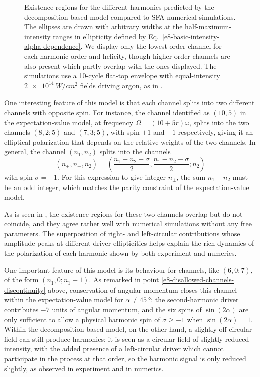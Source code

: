 \begin{figure}[h]
  \captionsetup{width=\textwidth}
  \caption[
  Existence regions for bicircular harmonics using the decomposition-based model, compared to SFA simulations
  ]{
  Existence regions for the different harmonics predicted by the decomposition-based model compared to SFA numerical simulations. The ellipses are drawn with arbitrary widths at the half-maximum-intensity ranges in ellipticity defined by Eq.~\eqref{e8-basic-intensity-alpha-dependence}. We display only the lowest-order channel for each harmonic order and helicity, though higher-order channels are also present which partly overlap with the ones displayed. 
  The simulations use a 10-cycle flat-top envelope with equal-intensity $\SI{2e14}{W/cm^2}$ fields driving argon, as in .
  }
  \label{f8-existence-region-ellipses}
\end{figure}




One interesting feature of this model is that each channel splits into two different channels with opposite spin. For instance, the channel identified as $(10, 5)$ in the expectation-value model, at frequency $\Omega=(10+5r)\omega$, splits into the two channels $(8, 2; 5)$ and $(7, 3; 5)$, with spin $+1$ and $-1$ respectively, giving it an elliptical polarization that depends on the relative weights of the two channels. In general, the channel $(n_1,n_2)$ splits into the \mbox{channels}
\begin{equation}
 (n_+,n_-,n_2)=\left(\frac{n_1+n_2+\sigma}{2},\frac{n_1-n_2-\sigma}{2};n_2\right)
 \label{e8-channel-translation}
\end{equation}
with spin $\sigma=\pm1$. For this expression to give integer $n_\pm$, the sum $n_1+n_2$ must be an odd integer, which matches the parity constraint of the expectation-value model.

As is seen in , the existence regions for these two channels overlap but do not coincide, and they agree rather well with numerical simulations without any free parameters. The superposition of right- and left-circular contributions whose amplitude peaks at different driver ellipticities helps explain the rich dynamics of the polarization of each harmonic shown by both experiment and numerics. 





One important feature of this model is its behaviour for channels, like $(6,0;7)$, of the form $(n_1,0;{n_1+1})$. As remarked in point \ref{e8-disallowed-channels-discontinuity} above, conservation of angular momentum closes this channel within the expectation-value model for $\alpha\neq\SI{45}{\degree}$: the second-harmonic driver contributes $-7$ units of angular momentum, and the six spins of $\sin(2\alpha)$ are only sufficient to allow a physical harmonic spin of $\sigma \geq -1$ when $\sin(2\alpha)=1$. Within the decomposition-based model, on the other hand, a slightly off-circular field can still produce harmonics: it is seen as a circular field of slightly reduced intensity, with the added presence of a left-circular driver which cannot participate in the process at that order, so the harmonic signal is only reduced slightly, as observed in experiment and in numerics.

